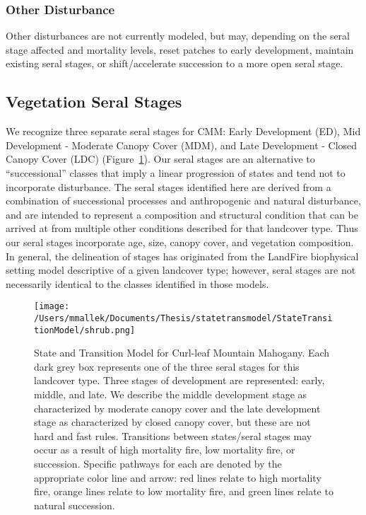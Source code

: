 \subsubsection{Other Disturbance}
Other disturbances are not currently modeled, but may, depending on the seral stage affected and mortality levels, reset patches to early development, maintain existing seral stages, or shift/accelerate succession to a more open seral stage. 

\subsection*{Vegetation Seral Stages}
We recognize three separate seral stages for CMM: Early Development (ED), Mid Development - Moderate Canopy Cover (MDM), and Late Development - Closed Canopy Cover (LDC) (Figure~\ref{cmm_transmodel}). Our seral stages are an alternative to ``successional'' classes that imply a linear progression of states and tend not to incorporate disturbance. The seral stages identified here are derived from a combination of successional processes and anthropogenic and natural disturbance, and are intended to represent a composition and structural condition that can be arrived at from multiple other conditions described for that landcover type. Thus our seral stages incorporate age, size, canopy cover, and vegetation composition. In general, the delineation of stages has originated from the LandFire biophysical setting model descriptive of a given landcover type; however, seral stages are not necessarily identical to the classes identified in those models.

\begin{figure}[hbt]
\centering
\texttt{[image: /Users/mmallek/Documents/Thesis/statetransmodel/StateTransitionModel/shrub.png]}
\caption{State and Transition Model for Curl-leaf Mountain Mahogany. Each dark grey box represents one of the three seral stages for this landcover type. Three stages of development are represented: early, middle, and late. We describe the middle development stage as characterized by moderate canopy cover and the late development stage as characterized by closed canopy cover, but these are not hard and fast rules. Transitions between states/seral stages may occur as a result of high mortality fire, low mortality fire, or succession. Specific pathways for each are denoted by the appropriate color line and arrow: red lines relate to high mortality fire, orange lines relate to low mortality fire, and green lines relate to natural succession.} 
\label{cmm_transmodel}
\end{figure}

